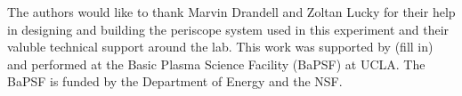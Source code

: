 \documentclass{jpp}
\begin{document}
 
The authors would like to thank Marvin Drandell and Zoltan Lucky for their help in designing and building the periscope system used in this experiment and their valuble technical support around the lab.  This work was supported by (fill in) and performed at the Basic Plasma Science Facility (BaPSF) at UCLA.  The BaPSF is funded by the Department of Energy and the NSF. 









\end{document}
